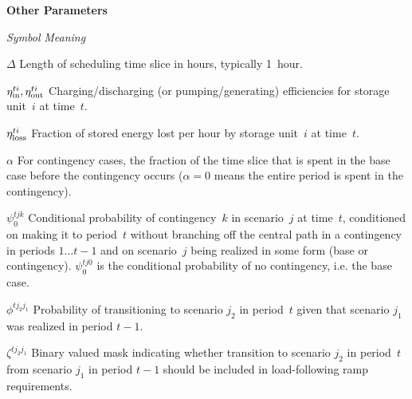 \documentclass[12pt]{article}
\newcommand{\namelistlabel}[1]{\mbox{#1}\hfil}
\newenvironment{namelist}[1]{%
\begin{list}{}
  {
    \let\makelabel\namelistlabel
    \settowidth{\labelwidth}{#1}
    \setlength{\leftmargin}{1.1\labelwidth}
  }
 }{%
\end{list}}
\numberwithin{equation}{section}
\numberwithin{table}{section}
\numberwithin{figure}{section}
\begin{document}
\begin{namelist}{XXXXXXXXXX}
\item[]
\item[{\bf Other Parameters}]
\item[\emph{Symbol}] \emph{Meaning}
\item[$\Delta$] Length of scheduling time slice in hours, typically 1~hour.
\item[$\eta^{ti}_{\rm in}, \eta^{ti}_{\rm out}$] Charging/discharging (or pumping/generating) efficiencies for storage unit~$i$ at time~$t$.
\item[$\eta^{ti}_{\rm loss}$] Fraction of stored energy lost per hour by storage unit~$i$ at time~$t$.
\item[$\alpha$] For contingency cases, the fraction of the time slice that is spent in the base case before the contingency occurs ($\alpha = 0$ means the entire period is spent in the contingency).
\item[$\psi_0^{tjk}$] Conditional probability of contingency~$k$ in scenario~$j$ at time~$t$, conditioned on making it to period~$t$ without branching off the central path in a contingency in periods $1\ldots t-1$ and on scenario~$j$ being realized in some form (base or contingency). $\psi_0^{tj0}$ is the conditional probability of no contingency, i.e. the base case.
\item[$\phi^{tj_2j_1}$] Probability of transitioning to scenario $j_2$ in period~$t$ given that scenario $j_1$ was realized in period $t-1$.
\item[$\zeta^{tj_2j_1}$] Binary valued mask indicating whether transition to scenario $j_2$ in period~$t$ from scenario $j_1$ in period $t-1$ should be included in load-following ramp requirements.


\end{namelist}
\end{document}
